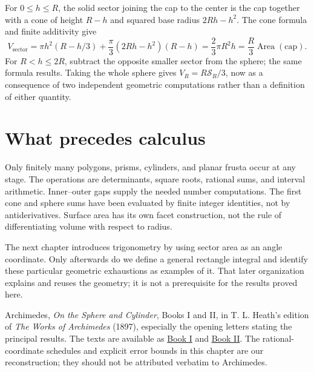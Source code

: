 For $0\le h\le R$, the solid sector joining the cap to the center is
the cap together with a cone of height $R-h$ and squared base radius
$2Rh-h^2$.  The cone formula and finite additivity give
\[
 V_{\mathrm{sector}}
 =\pi h^2(R-h/3)+\frac\pi3(2Rh-h^2)(R-h)
 =\frac23\pi R^2h
 =\frac R3\operatorname{Area}(\text{cap}).
\]
For $R<h\le2R$, subtract the opposite smaller sector from the sphere;
the same formula results.  Taking the whole sphere gives
$V_R=R\mathcal S_R/3$, now as a consequence of two independent geometric
computations rather than a definition of either quantity.

\section{What precedes calculus}
Only finitely many polygons, prisms, cylinders, and planar frusta occur at
any stage.  The operations are determinants, square roots, rational sums,
and interval arithmetic.  Inner--outer gaps supply the needed number
computations.  The first cone and sphere sums have been evaluated by finite
integer identities, not by antiderivatives.  Surface area has its own
facet construction, not the rule of differentiating volume with respect
to radius.

The next chapter introduces trigonometry by using sector area as an angle
coordinate.  Only afterwards do we define a general rectangle integral
and identify these particular geometric exhaustions as examples of it.
That later organization explains and reuses the geometry; it is not a
prerequisite for the results proved here.

\begin{remark}
Archimedes, \emph{On the Sphere and Cylinder}, Books I and II, in T. L.
Heath's edition of \emph{The Works of Archimedes} (1897), especially the
opening letters stating the principal results.  The texts are available
as \href{https://doi.org/10.1017/CBO9780511695124.010}{Book I} and
\href{https://doi.org/10.1017/CBO9780511695124.011}{Book II}.
The rational-coordinate schedules and explicit error bounds in this
chapter are our reconstruction; they should not be attributed verbatim
to Archimedes.
\end{remark}
